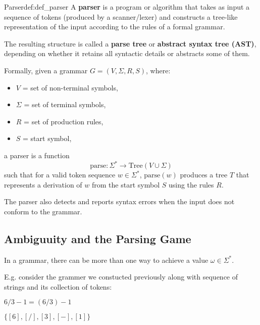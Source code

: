 \documentclass[12pt,a4paper]{article}
\newcommand{\newpar} {
  \vspace{1em}
  \noindent
}
\begin{document}
\begin{definition}{Parser}{def:def_parser}\label{def_parser}
	A \textbf{parser} is a program or algorithm that takes as input a sequence of tokens
	(produced by a scanner/lexer) and constructs a tree-like representation of the input
	according to the rules of a formal grammar.

	The resulting structure is called a \textbf{parse tree} or \textbf{abstract syntax tree (AST)},
	depending on whether it retains all syntactic details or abstracts some of them.

	Formally, given a grammar \(G = (V, \Sigma, R, S)\), where:
	\begin{itemize}
		\item \(V\) = set of non-terminal symbols,
		\item \(\Sigma\) = set of terminal symbols,
		\item \(R\) = set of production rules,
		\item \(S\) = start symbol,
	\end{itemize}
	a parser is a function
	\[
		\text{parse} : \Sigma^* \to \text{Tree}(V \cup \Sigma)
	\]
	such that for a valid token sequence \(w \in \Sigma^*\), \(\text{parse}(w)\) produces a tree \(T\)
	that represents a derivation of \(w\) from the start symbol \(S\) using the rules \(R\).

	The parser also detects and reports syntax errors when the input does not conform to the grammar.
\end{definition}

\subsection{Ambiguuity and the Parsing Game}

In a grammar, there can be more than one way to achieve a value
\(\omega \in \Sigma ^ *\).

\newpar
E.g. consider the grammer we constucted previously
along with sequence of strings and its collection of tokens:

\(6 / 3 - 1 =  (6 / 3) - 1\)

\(\{[6], [/], [3], [-], [1]\}\)
\end{document}
